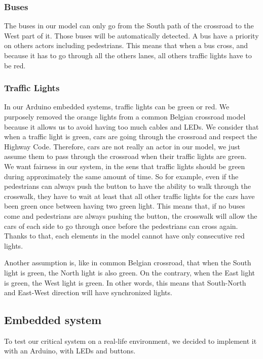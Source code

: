 \subsubsection{Buses}
The buses in our model can only go from the South path of the crossroad to the West part of it. Those buses will be automatically detected. A bus have a priority on others actors including pedestrians. This means that when a bus cross, and because it has to go through all the others lanes, all others traffic lights have to be red.

\subsubsection{Traffic Lights}
In our Arduino embedded systems, traffic lights can be green or red. We purposely removed the orange lights from a common Belgian crossroad model because it allows us to avoid having too much cables and LEDs. We consider that when a traffic light is green, cars are going through the crossroad and respect the Highway Code. Therefore, cars are not really an actor in our model, we just assume them to pass through the crossroad when their traffic lights are green. \\

We want fairness in our system, in the sens that traffic lights should be green during approximately the same amount of time. So for example, even if the pedestrians can always push the button to have the ability to walk through the crosswalk, they have to wait at least that all other traffic lights for the cars have been green once between having two green light. This means that, if no buses come and pedestrians are always pushing the button, the crosswalk will allow the cars of each side to go through once before the pedestrians can cross again. Thanks to that, each elements in the model cannot have only consecutive red lights.

Another assumption is, like in common Belgian crossroad, that when the South light is green, the North light is also green. On the contrary, when the East light is green, the West light is green. In other words, this means that South-North and East-West direction will have synchronized lights.


\subsection{Embedded system}

To test our critical system on a real-life environment, we decided to implement it with an Arduino, with LEDs and buttons.

